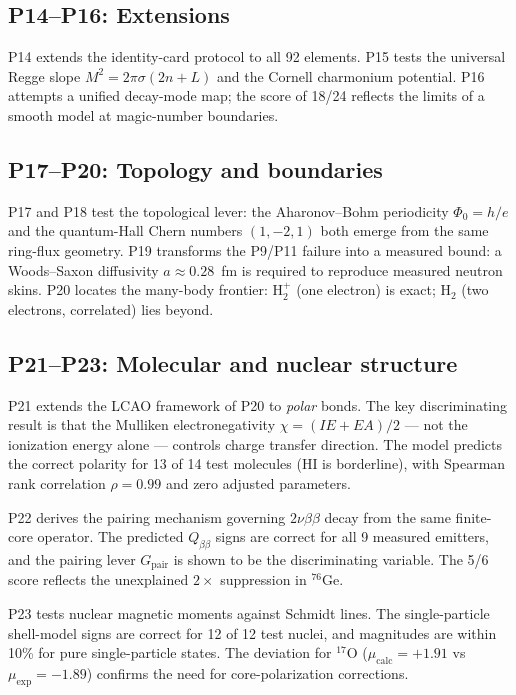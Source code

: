\documentclass[11pt,a4paper]{article}
\begin{document}
\subsection{P14--P16: Extensions}
P14 extends the identity-card protocol to all 92 elements. P15 tests the universal Regge slope $M^2 = 2\pi\sigma(2n+L)$ and the Cornell charmonium potential. P16 attempts a unified decay-mode map; the score of 18/24 reflects the limits of a smooth model at magic-number boundaries.

\subsection{P17--P20: Topology and boundaries}
P17 and P18 test the topological lever: the Aharonov--Bohm periodicity $\Phi_0 = h/e$ and the quantum-Hall Chern numbers $(1,-2,1)$ both emerge from the same ring-flux geometry. P19 transforms the P9/P11 failure into a measured bound: a Woods--Saxon diffusivity $a \approx 0.28$~fm is required to reproduce measured neutron skins. P20 locates the many-body frontier: H$_2^+$ (one electron) is exact; H$_2$ (two electrons, correlated) lies beyond.

\subsection{P21--P23: Molecular and nuclear structure}
P21 extends the LCAO framework of P20 to \emph{polar} bonds. The key discriminating result is that the Mulliken electronegativity $\chi=(IE+EA)/2$ --- not the ionization energy alone --- controls charge transfer direction. The model predicts the correct polarity for 13 of 14 test molecules (HI is borderline), with Spearman rank correlation $\rho=0.99$ and zero adjusted parameters.

P22 derives the pairing mechanism governing $2\nu\beta\beta$ decay from the same finite-core operator. The predicted $Q_{\beta\beta}$ signs are correct for all 9 measured emitters, and the pairing lever $G_{\text{pair}}$ is shown to be the discriminating variable. The 5/6 score reflects the unexplained $2\times$ suppression in $^{76}$Ge.

P23 tests nuclear magnetic moments against Schmidt lines. The single-particle shell-model signs are correct for 12 of 12 test nuclei, and magnitudes are within 10\% for pure single-particle states. The deviation for $^{17}$O ($\mu_{\text{calc}}=+1.91$ vs $\mu_{\text{exp}}=-1.89$) confirms the need for core-polarization corrections.
\end{document}

